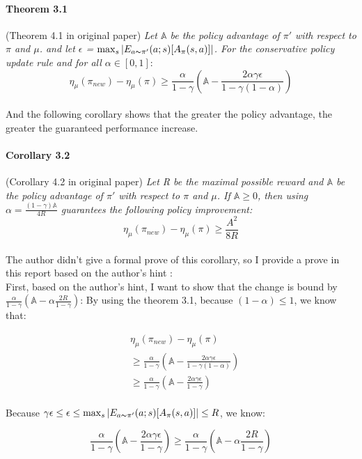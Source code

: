 \begin{itemize}
\paragraph{Theorem 3.1} (Theorem 4.1 in original paper)
\emph{Let $\mathbb{A}$ be the policy advantage of $\pi'$ with respect to $\pi$ and $\mu$. and let $\epsilon$ = $\max_{s}|E_{a{\thicksim}\pi'}(a;s)[A_{\pi}(s,a)]|$. For the conservative policy update rule and for all $\alpha \in [0, 1]:$}
\[\eta_{\mu}(\pi_{new}) - \eta_{\mu}(\pi) \geq \frac{\alpha}{1-\gamma} (\mathbb{A} - \frac{2\alpha\gamma\epsilon}{1 - \gamma(1 - \alpha)}) \]
\\

And the following corollary shows that the greater the policy advantage, the greater the guaranteed performance
increase.

\paragraph{Corollary 3.2} (Corollary 4.2 in original paper)
\emph{Let R be the maximal possible reward and $\mathbb{A}$ be the policy advantage of $\pi'$ with respect to $\pi$ and $\mu$. If $\mathbb{A} \geq 0$, then using $\alpha = \frac{(1 - \gamma)\mathbb{A}}{4R}$ guarantees the following policy improvement:}
\[\eta_{\mu}(\pi_{new}) - \eta_{\mu}(\pi) \geq \frac{A^{2}}{8R}\]
\\

The author didn't give a formal prove of this corollary, so I provide a prove in this report based on the author's hint : \\
First, based on the author's hint, I want to show that the change is bound by $\frac{\alpha}{1 - \gamma}
(\mathbb{A} - \alpha \frac{2R}{1 - \gamma})$:
By using the theorem 3.1, because $(1-\alpha) \leq 1$, we know that:

\begin{align*}
& \eta_{\mu}(\pi_{new}) - \eta_{\mu}(\pi) \\
& \geq \frac{\alpha}{1-\gamma} (\mathbb{A} - \frac{2\alpha\gamma\epsilon}{1 - \gamma(1 - \alpha)}) \\
& \geq \frac{\alpha}{1 - \gamma}(\mathbb{A} - \frac{2\alpha\gamma\epsilon}{1 - \gamma})
\end{align*}
\\

Because $\gamma \epsilon \leq \epsilon \leq \max_{s} |E_{a{\thicksim}\pi'}(a;s)[A_{\pi}(s,a)]| \leq R$, we know:

\[\frac{\alpha}{1 - \gamma}(\mathbb{A} - \frac{2\alpha\gamma\epsilon}{1 - \gamma}) \geq
\frac{\alpha}{1 - \gamma}(\mathbb{A} - \alpha \frac{2R}{1 - \gamma})\]


\end{itemize}
